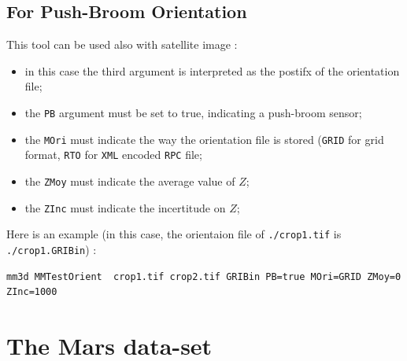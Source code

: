 \subsection{For Push-Broom Orientation}
\label{TestOri:PB}

This tool can be used also with satellite image :
\begin{itemize}
  \item in this case the third argument is interpreted as the postifx of the orientation file;
  \item the {\tt PB} argument must be set to true, indicating a push-broom sensor;
  \item the {\tt MOri} must indicate the way the orientation file is stored ({\tt GRID} for grid format,
       {\tt RTO} for  {\tt XML} encoded {\tt RPC} file;
  \item the {\tt ZMoy} must indicate the average value of $Z$;
  \item the {\tt ZInc} must indicate the incertitude on  $Z$;
\end{itemize}

Here is an example (in this case, the orientaion file of {\tt ./crop1.tif} is {\tt ./crop1.GRIBin}) :

\begin{verbatim}
mm3d MMTestOrient  crop1.tif crop2.tif GRIBin PB=true MOri=GRID ZMoy=0 ZInc=1000 
\end{verbatim}


\section{The Mars data-set}

\label{Mars}



